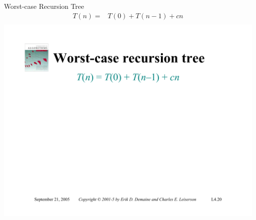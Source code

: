 \documentclass{beamer}
\begin{document}
\begin{frame}{Worst-case Recursion Tree}
    \begin{equation*}
        \begin{split}
            T(n) =& T(0) + T(n - 1) + cn \\
        \end{split}
    \end{equation*}
    \centering
    \includegraphics[width=\textwidth, trim={1.00cm 1.80cm 0.50cm 5.25cm}, clip]{pages/lec4_20}
\end{frame}
\end{document}

